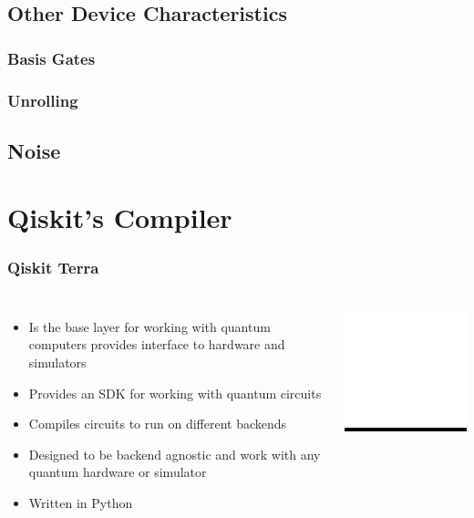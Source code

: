 \documentclass[aspectratio=169,11pt,hyperref={colorlinks=true}]{beamer}
\begin{document}
\subsection{Other Device Characteristics}
\begin{frame}
    \frametitle{Basis Gates}

\end{frame}
\begin{frame}
    \frametitle{Unrolling}

\end{frame}
\subsection{Noise}
\begin{frame}

\end{frame}

\section{Qiskit's Compiler}
\begin{frame}
    \frametitle{Qiskit Terra}
    \begin{columns}
             \begin{itemize}
                  \item Is the base layer for working with quantum computers provides interface to hardware and simulators
                  \item Provides an SDK for working with quantum circuits
                  \item Compiles circuits to run on different backends
                  \item Designed to be backend agnostic and work with any
                      quantum hardware or simulator
                  \item Written in Python
             \end{itemize}
              \centering
              \colorbox{black}{\includegraphics[width=.5\textwidth]{qiskit-terra-logo.png}}
      \end{columns}
  \end{frame}
\end{document}
